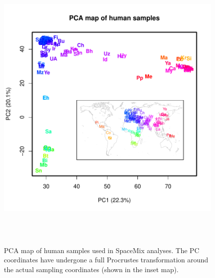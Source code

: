 \documentclass[12pt]{article}
\begin{document}
\clearpage

\begin{figure}
	\centering
		{\includegraphics[width=5.5in,height=5.5in]{figs/globetrotter/globe_PCA_map.pdf}}
	\caption{PCA map of human samples used in SpaceMix analyses.  The PC coordinates have undergone a full Procrustes transformation around the actual sampling coordinates (shown in the inset map).}
\label{sfig:globe_PCA_map}
\end{figure}

\clearpage
\end{document}
